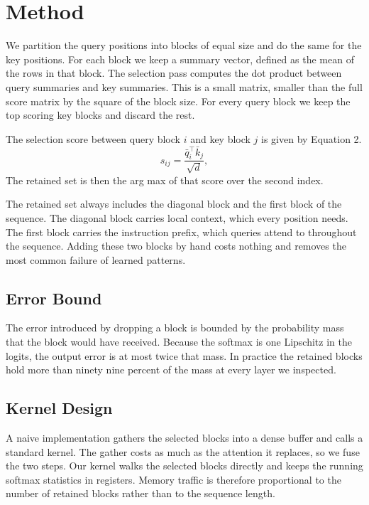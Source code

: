 \documentclass[10pt,twocolumn,a4paper]{article}
\newcommand{\s}[1]{#1}
\begin{document}
\section{Method}

\s{We partition the query positions into blocks of equal size and do the same for the key positions.}
\s{For each block we keep a summary vector, defined as the mean of the rows in that block.}
\s{The selection pass computes the dot product between query summaries and key summaries.}
\s{This is a small matrix, smaller than the full score matrix by the square of the block size.}
\s{For every query block we keep the top scoring key blocks and discard the rest.}

\s{The selection score between query block $i$ and key block $j$ is given by Equation 2.}
\begin{equation}
  s_{ij} = \frac{\bar{q}_i^{\top} \bar{k}_j}{\sqrt{d}} ,
  \label{eq:sel}
\end{equation}
\s{The retained set is then the arg max of that score over the second index.}

\s{The retained set always includes the diagonal block and the first block of the sequence.}
\s{The diagonal block carries local context, which every position needs.}
\s{The first block carries the instruction prefix, which queries attend to throughout the sequence.}
\s{Adding these two blocks by hand costs nothing and removes the most common failure of learned patterns.}

\subsection{Error Bound}

\s{The error introduced by dropping a block is bounded by the probability mass that the block would have received.}
\s{Because the softmax is one Lipschitz in the logits, the output error is at most twice that mass.}
\s{In practice the retained blocks hold more than ninety nine percent of the mass at every layer we inspected.}

\subsection{Kernel Design}

\s{A naive implementation gathers the selected blocks into a dense buffer and calls a standard kernel.}
\s{The gather costs as much as the attention it replaces, so we fuse the two steps.}
\s{Our kernel walks the selected blocks directly and keeps the running softmax statistics in registers.}
\s{Memory traffic is therefore proportional to the number of retained blocks rather than to the sequence length.}
\end{document}
